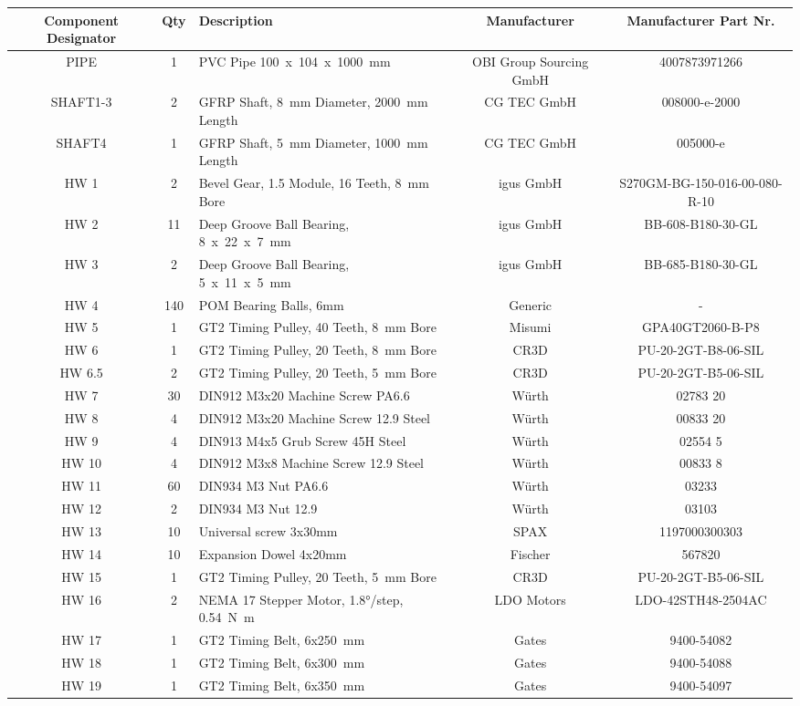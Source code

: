 \begin{tabularx}{\textwidth}{|C|c|X|C|C|}
    \hline
    \textbf{Component} \textbf{Designator}& \textbf{Qty} & \textbf{Description} & \textbf{Manufacturer} & \textbf{Manufacturer} \textbf{Part Nr.} \\
    \hline
    \endhead
    PIPE & 1 & PVC Pipe 100\ x\ 104\ x\ 1000\ mm & OBI Group Sourcing GmbH & 4007873971266\\
    SHAFT1-3 & 2 & GFRP Shaft, \SI{8}{mm} Diameter, \SI{2000}{mm} Length & CG TEC GmbH & 008000-e-2000 \\
    SHAFT4 & 1 & GFRP Shaft, \SI{5}{mm} Diameter, \SI{1000}{mm} Length & CG TEC GmbH & 005000-e \\ 
    HW 1 & 2 & Bevel Gear, 1.5 Module, 16 Teeth, \SI{8}{mm} Bore& igus GmbH & S270GM-BG-150-016-00-080-R-10 \\
    HW 2 & 11 & Deep Groove Ball Bearing, 8\ x\ 22\ x\ 7\ mm & igus GmbH & BB-608-B180-30-GL \\
    HW 3 & 2 & Deep Groove Ball Bearing, 5\ x\ 11\ x\ 5\ mm & igus GmbH & BB-685-B180-30-GL \\
    HW 4 & 140 & POM Bearing Balls, 6mm & Generic & - \\
    HW 5 & 1 & GT2 Timing Pulley, 40 Teeth, \SI{8}{mm} Bore & Misumi & GPA40GT2060-B-P8 \\
    HW 6 & 1 & GT2 Timing Pulley, 20 Teeth, \SI{8}{mm} Bore & CR3D & PU-20-2GT-B8-06-SIL \\
    HW 6.5 & 2 & GT2 Timing Pulley, 20 Teeth, \SI{5}{mm} Bore & CR3D & PU-20-2GT-B5-06-SIL \\
    HW 7 & 30 & DIN912 M3x20 Machine Screw PA6.6 & Würth & 02783  20 \\
    HW 8 & 4 & DIN912 M3x20 Machine Screw 12.9 Steel & Würth & 00833 20\\
    HW 9 & 4 & DIN913 M4x5 Grub Screw 45H Steel & Würth & 02554 5\\
    HW 10 & 4 & DIN912 M3x8 Machine Screw 12.9 Steel & Würth & 00833 8\\
    HW 11 & 60 & DIN934 M3 Nut PA6.6 & Würth & 03233\\
    HW 12 & 2 & DIN934 M3 Nut 12.9 & Würth & 03103\\
    HW 13 & 10 & Universal screw 3x30mm & SPAX & 1197000300303\\
    HW 14 & 10 & Expansion Dowel 4x20mm & Fischer & 567820\\
    HW 15 & 1 & GT2 Timing Pulley, 20 Teeth, \SI{5}{mm} Bore & CR3D & PU-20-2GT-B5-06-SIL \\
    HW 16 & 2 & NEMA 17 Stepper Motor, 1.8°/step, \SI{0.54}{\newton\meter} & LDO Motors & LDO-42STH48-2504AC\\
    HW 17 & 1 & GT2 Timing Belt, 6x250\ mm & Gates & 9400-54082\\
    HW 18 & 1 & GT2 Timing Belt, 6x300\ mm & Gates & 9400-54088\\
    HW 19 & 1 & GT2 Timing Belt, 6x350\ mm & Gates & 9400-54097 \\
    \hline
\end{tabularx}



